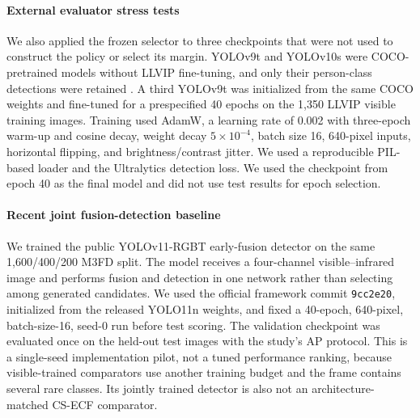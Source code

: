 \documentclass[preprint,11pt]{elsarticle}
\begin{document}
\paragraph{External evaluator stress tests}
We also applied the frozen selector to three checkpoints that were not used to
construct the policy or select its margin. YOLOv9t and YOLOv10s were
COCO-pretrained models without LLVIP fine-tuning, and only their person-class
detections were retained \cite{wang2024yolov9,wang2024yolov10}. A third
YOLOv9t was initialized from the same COCO weights and fine-tuned for a
prespecified 40 epochs on the 1,350 LLVIP visible training images. Training
used AdamW, a learning rate of 0.002 with three-epoch warm-up and cosine decay,
weight decay \(5\times10^{-4}\), batch size 16, 640-pixel inputs, horizontal
flipping, and brightness/contrast jitter. We used a reproducible PIL-based
loader and the Ultralytics detection loss. We used the checkpoint from epoch 40
as the final model and did not use test results for epoch selection.

\paragraph{Recent joint fusion-detection baseline}
We trained the public YOLOv11-RGBT early-fusion detector
\cite{wan2025yolo11rgbt} on the same 1,600/400/200 M3FD split. The model
receives a four-channel visible--infrared image and performs fusion and
detection in one network rather than selecting among generated candidates. We
used the official framework commit \texttt{9cc2e20}, initialized from the
released YOLO11n weights, and fixed a 40-epoch, 640-pixel, batch-size-16, seed-0
run before test scoring. The validation checkpoint was evaluated once on the
held-out test images with the study's AP protocol. This is a single-seed
implementation pilot, not a tuned performance ranking, because visible-trained
comparators use another training budget and the frame contains several rare
classes. Its jointly trained detector is also not an architecture-matched
CS-ECF comparator.
\end{document}
